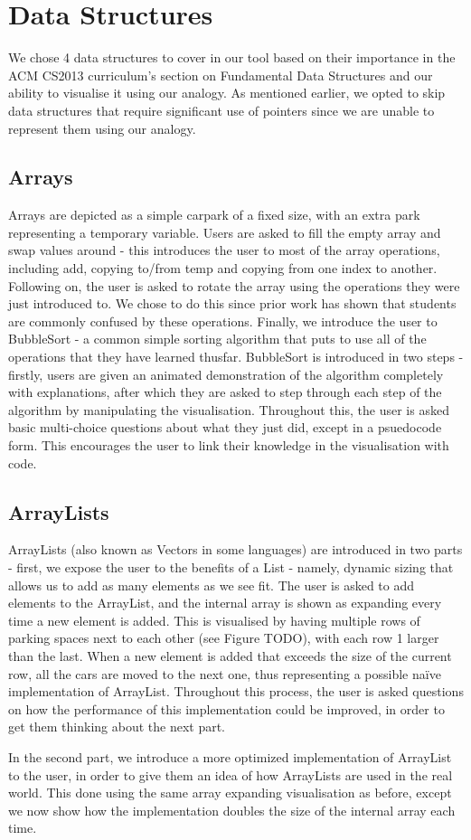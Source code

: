 \documentclass[10pt]{article}
\begin{document}
\section{Data Structures}
We chose 4 data structures to cover in our tool based on their importance in the ACM CS2013 curriculum's section on Fundamental Data Structures\cite{CS2013} and our ability to visualise it using our analogy. As mentioned earlier, we opted to skip data structures that require significant use of pointers since we are unable to represent them using our analogy.
\subsection{Arrays}
Arrays are depicted as a simple carpark of a fixed size, with an extra park representing a temporary variable. Users are asked to fill the empty array and swap values around - this introduces the user to most of the array operations, including add, copying to/from temp and copying from one index to another. Following on, the user is asked to rotate the array using the operations they were just introduced to. We chose to do this since prior work\cite{izuloop} has shown that students are commonly confused by these operations. Finally, we introduce the user to BubbleSort - a common simple sorting algorithm that puts to use all of the operations that they have learned thusfar. BubbleSort is introduced in two steps - firstly, users are given an animated demonstration of the algorithm completely with explanations, after which they are asked to step through each step of the algorithm by manipulating the visualisation. Throughout this, the user is asked basic multi-choice questions about what they just did, except in a psuedocode form. This encourages the user to link their knowledge in the visualisation with code.
\subsection{ArrayLists}
ArrayLists (also known as Vectors in some languages) are introduced in two parts - first, we expose the user to the benefits of a List - namely, dynamic sizing that allows us to add as many elements as we see fit. The user is asked to add elements to the ArrayList, and the internal array is shown as expanding every time a new element is added. This is visualised by having multiple rows of parking spaces next to each other (see Figure TODO), with each row 1 larger than the last. When a new element is added that exceeds the size of the current row, all the cars are moved to the next one, thus representing a possible naïve implementation of ArrayList. Throughout this process, the user is asked questions on how the performance of this implementation could be improved, in order to get them thinking about the next part.\par
In the second part, we introduce a more optimized implementation of ArrayList to the user, in order to give them an idea of how ArrayLists are used in the real world. This done using the same array expanding visualisation as before, except we now show how the implementation doubles the size of the internal array each time.
\end{document}

